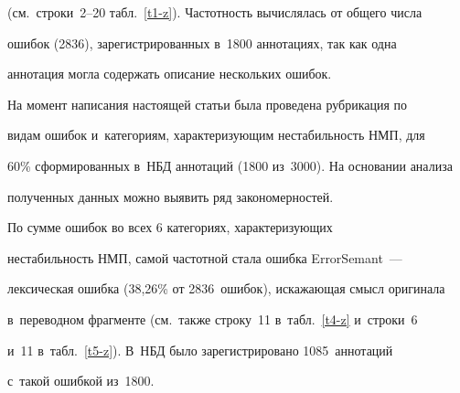 (см.\ строки~2--20 табл.~\ref{t1-z}). Частотность вычислялась от общего числа 


ошибок (2836), зарегистрированных в~1800 аннотациях, так как  одна 


аннотация могла содержать описание нескольких ошибок.





  На момент написания настоящей статьи была проведена рубрикация по 


видам ошибок и~категориям, характеризующим нестабильность НМП, для 


60\% сформированных в~НБД аннотаций (1800 из~3000). На основании анализа 


полученных данных можно выявить ряд закономерностей. 


  


  По сумме ошибок во всех 6 категориях, характеризующих 


нестабильность НМП, самой частотной стала ошибка ErrorSemant~--- 


лексическая ошибка (38,26\% от 2836~ошибок), искажающая смысл оригинала 


в~переводном фрагменте (см.\ также строку~11 в~табл.~\ref{t4-z} и~строки~6 


и~11 в~табл.~\ref{t5-z}). В~НБД было зарегистрировано 1085~аннотаций 


с~такой ошибкой из~1800.





\pagebreak


  


